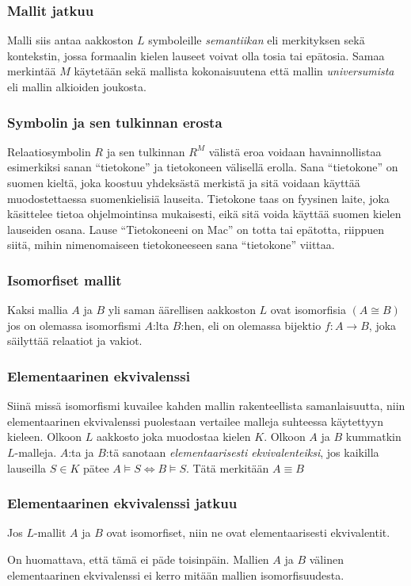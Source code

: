 \documentclass{beamer}
\begin{document}
\begin{frame}
\frametitle{Mallit jatkuu}
Malli siis antaa aakkoston $L$ symboleille \textit{semantiikan} eli merkityksen sekä kontekstin, jossa formaalin kielen lauseet voivat olla tosia tai epätosia. \pause Samaa merkintää $M$ käytetään sekä mallista kokonaisuutena että mallin \textit{universumista} eli mallin alkioiden joukosta.
\end{frame}

\begin{frame}
\frametitle{Symbolin ja sen tulkinnan erosta}
Relaatiosymbolin $R$ ja sen tulkinnan $R^M$ välistä eroa voidaan havainnollistaa esimerkiksi sanan ``tietokone'' ja tietokoneen välisellä erolla. \pause Sana ``tietokone'' on suomen kieltä, joka koostuu yhdeksästä merkistä ja sitä voidaan käyttää muodostettaessa suomenkielisiä lauseita. \pause Tietokone taas on fyysinen laite, joka käsittelee tietoa ohjelmointinsa mukaisesti, eikä sitä voida käyttää suomen kielen lauseiden osana. \pause Lause ``Tietokoneeni on Mac'' on totta tai epätotta, riippuen siitä, mihin nimenomaiseen tietokoneeseen sana ``tietokone'' viittaa.
\end{frame}

\begin{frame}
\frametitle{Isomorfiset mallit}
Kaksi mallia $A$ ja $B$ yli saman äärellisen aakkoston $L$ ovat isomorfisia $(A \cong B)$ jos on olemassa isomorfismi $A$:lta $B$:hen, eli on olemassa bijektio $f: A \rightarrow B$, joka säilyttää relaatiot ja vakiot.
\end{frame}

\begin{frame}
\frametitle{Elementaarinen ekvivalenssi}
Siinä missä isomorfismi kuvailee kahden mallin rakenteellista samanlaisuutta, niin elementaarinen ekvivalenssi puolestaan vertailee malleja suhteessa käytettyyn kieleen. \pause Olkoon $L$ aakkosto joka muodostaa kielen $K$. Olkoon $A$ ja $B$ kummatkin $L$-malleja. $A$:ta ja $B$:tä sanotaan \textit{elementaarisesti ekvivalenteiksi}, jos kaikilla lauseilla $S \in K$ pätee $A \vDash S \Longleftrightarrow B \vDash S$. Tätä merkitään $A \equiv B$
\end{frame}

\begin{frame}
\frametitle{Elementaarinen ekvivalenssi jatkuu}
Jos $L$-mallit $A$ ja $B$ ovat isomorfiset, niin ne ovat elementaarisesti ekvivalentit. \pause

On huomattava, että tämä ei päde toisinpäin. Mallien $A$ ja $B$ välinen elementaarinen ekvivalenssi ei kerro mitään mallien isomorfisuudesta. 
\end{frame}
\end{document}
